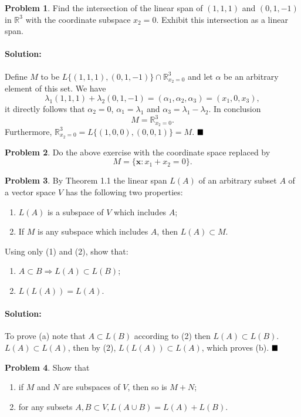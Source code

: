\documentclass[]{article}
\newcommand{\RR}{\mathbb{R}}
\theoremstyle{definition}
\newtheorem{problem}{Problem}
\newenvironment{solution}{\paragraph{Solution:}}{\hfill$\blacksquare \\$}
\begin{document}
\begin{problem}
	Find the intersection of the linear span of $(1,1,1)$ and $(0,1,-1)$ in $\RR^3$ with the coordinate subspace $x_2 = 0$. Exhibit this intersection as a linear span.
\end{problem}
\begin{solution}
	Define $M$ to be $L\{(1,1,1),(0,1,-1) \} \cap \RR^3_{x_2 = 0}$ and let $\alpha$ be an arbitrary element of this set. We have 
	\[
		\lambda_1(1,1,1) + \lambda_2(0,1,-1) = (\alpha_1, \alpha_2, \alpha_3) = (x_1, 0, x_3),
	\]
	it directly follows that $\alpha_2 = 0$, $\alpha_1 = \lambda_1$ and $\alpha_3 = \lambda_1 - \lambda_2$. In conclusion
	\[
		M = \RR^3_{x_2 = 0}.
	\]
	Furthermore, $\RR^3_{x_2 = 0} = L\{(1,0,0), (0,0,1)\} = M$.	
\end{solution}
\begin{problem}
Do the above exercise with the coordinate space replaced by
\[
	M = \{ \mathbf{x} : x_1 + x_2 = 0 \}.
\]

\end{problem}
\begin{problem}
	By Theorem 1.1 the linear span $L(A)$ of an arbitrary subset $A$ of a vector space $V$ has the following two properties:
	\begin{enumerate}
		\item $L(A)$ is a subspace of $V$ which includes $A$;
		\item If $M$ is any subspace which includes $A$, then $L(A) \subset M$.
	\end{enumerate}
	Using only (1) and (2), show that:
	\begin{enumerate}[label = (\alph*)]
		\item $A \subset B \Rightarrow L(A) \subset L(B)$;
		\item $L(L(A)) = L(A)$.
	\end{enumerate}
\end{problem}
\begin{solution}
	To prove (a) note that $A \subset L(B)$ according to (2) then $L(A) \subset L(B)$. 
	$L(A) \subset L(A)$, then by (2), $L(L(A)) \subset L(A)$, which proves (b).
\end{solution}
\begin{problem}
	Show that
	\begin{enumerate}[label = (\alph*)]
		\item if $M$ and $N$ are subspaces of $V$, then so is $M+N$;
		\item for any subsets $A,B \subset V, L(A \cup B) = L(A) + L(B)$.
	\end{enumerate}
\end{problem}
\end{document}
